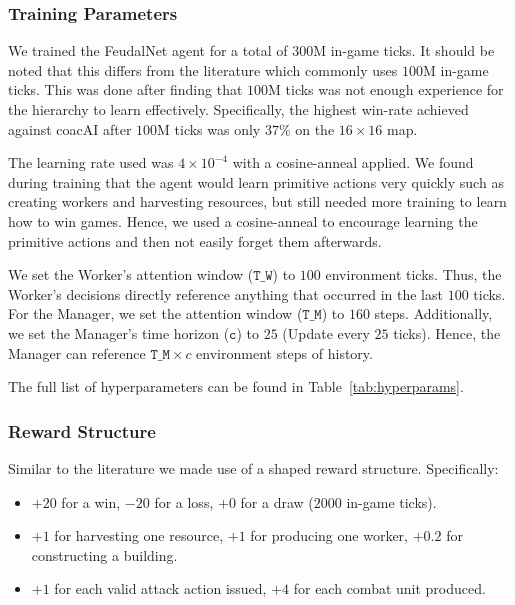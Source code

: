 \documentclass[sigconf,review=false]{acmart}
\begin{document}
\subsubsection{Training Parameters}
We trained the FeudalNet agent for a total of $300$M in-game ticks.
It should be noted that this differs from the literature which commonly uses $100$M in-game ticks.
This was done after finding that $100$M ticks was not enough experience for the hierarchy to learn effectively.
Specifically, the highest win-rate achieved against coacAI after $100$M ticks was only $37$\% on the $16\times 16$ map.

The learning rate used was $4\times10^{-4}$ with a cosine-anneal applied.
We found during training that the agent would learn primitive actions very quickly such as creating workers and harvesting resources, but still needed more training to learn how to win games.
Hence, we used a cosine-anneal to encourage learning the primitive actions and then not easily forget them afterwards.

We set the Worker's attention window ($\texttt{T\_W}$) to $100$ environment ticks.
Thus, the Worker's decisions directly reference anything that occurred in the last $100$ ticks. 
For the Manager, we set the attention window ($\texttt{T\_M}$) to $160$ steps.
Additionally, we set the Manager's time horizon ($\texttt{c}$) to $25$ (Update every $25$ ticks).
Hence, the Manager can reference $\texttt{T\_M} \times c$ environment steps of history.

The full list of hyperparameters can be found in Table~\ref{tab:hyperparams}.

\subsubsection{Reward Structure}
\label{reward-struct}
Similar to the literature we made use of a shaped reward structure.
Specifically:

\begin{itemize}
    \item $+20$ for a win, $-20$ for a loss, $+0$ for a draw ($2000$ in-game ticks).
    \item $+1$ for harvesting one resource, $+1$ for producing one worker, $+0.2$ for constructing a building.
    \item $+1$ for each valid attack action issued, $+4$ for each combat unit produced.
\end{itemize}
\end{document}
